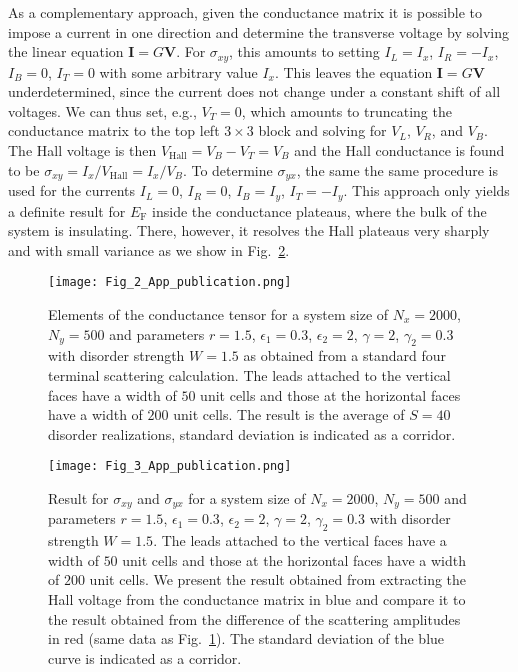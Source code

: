 \documentclass[aps,prb,amsmath,amssymb,twocolumn, superscriptaddress]{revtex4-2}
\begin{document}
As a complementary approach, given the conductance matrix it is possible to impose a current in one direction and determine the transverse voltage by solving the linear equation $\bm I = G \bm V$. For $\sigma_{xy}$, this amounts to setting $I_L = I_x$, $I_R = -I_x$, $I_B = 0$, $I_T = 0$ with some arbitrary value $I_x$. This leaves the equation $\bm I = G \bm V$ underdetermined, since the current does not change under a constant shift of all voltages. We can thus set, e.g., $V_T = 0$, which amounts to truncating the conductance matrix to the top left $3\times3$ block and solving for $V_L$, $V_R$, and $V_B$. The Hall voltage is then $V_\mathrm{Hall} = V_B - V_T = V_B$ and the Hall conductance is found to be $\sigma_{xy} = I_x / V_\mathrm{Hall} = I_x / V_B$. To determine $\sigma_{yx}$, the same the same procedure is used for the currents $I_L = 0$, $I_R = 0$, $I_B = I_y$, $I_T = - I_y$. This approach only yields a definite result for $E_\mathrm{F} $ inside the conductance plateaus, where the bulk of the system is insulating. There, however, it resolves the Hall plateaus very sharply and with small variance as we show in Fig.~\ref{Fig:V_Hall_4_terminal}.


\begin{figure}[htp]	 
\texttt{[image: Fig\_2\_App\_publication.png]}
\caption{Elements of the conductance tensor for a system size of $N_x = 2000$, $N_y = 500$ and parameters $r = 1.5$, $\epsilon_1 = 0.3$, $\epsilon_2 = 2$, $\gamma  =2$, $\gamma_2 = 0.3$ with disorder strength $W = 1.5$ as obtained from a standard four terminal scattering calculation. The leads attached to the vertical faces have a width of $50$ unit cells and those at the horizontal faces have a width of $200$ unit cells. The result is the average of $S = 40$ disorder realizations, standard deviation is indicated as a corridor.
 }\label{Fig:Hall_cond_4_terminal}
\end{figure}


\begin{figure}[htp]	 
\texttt{[image: Fig\_3\_App\_publication.png]}
\caption{Result for $\sigma_{xy}$ and $\sigma_{yx}$ for a system size of $N_x = 2000$, $N_y = 500$ and parameters $r = 1.5$, $\epsilon_1 = 0.3$, $\epsilon_2 = 2$, $\gamma  =2$, $\gamma_2 = 0.3$ with disorder strength $W = 1.5$. The leads attached to the vertical faces have a width of $50$ unit cells and those at the horizontal faces have a width of $200$ unit cells.  We present the result obtained from extracting the Hall voltage from the conductance matrix in blue and compare it to the result obtained from the difference of the scattering amplitudes in red (same data as Fig.~\ref{Fig:Hall_cond_4_terminal}). The standard deviation of the blue curve is indicated as a corridor.
 }\label{Fig:V_Hall_4_terminal}
\end{figure}
\end{document}
